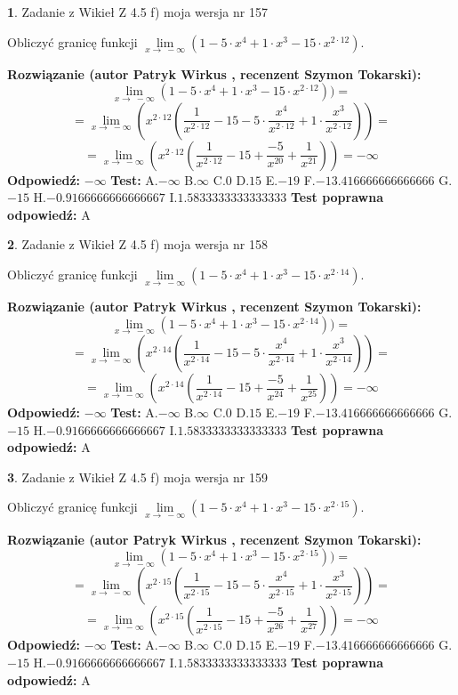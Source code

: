 \documentclass[12pt, a4paper]{article}
\theoremstyle{definition} %
\newtheorem{zad}{}
\newcommand{\zadStart}[1]{\begin{zad}#1\newline}
\newcommand{\zadStop}{\end{zad}}
\newcommand{\rozwStart}[2]{\noindent \textbf{Rozwiązanie (autor #1 , recenzent #2): }\newline}
\newcommand{\rozwStop}{\newline}
\newcommand{\odpStart}{\noindent \textbf{Odpowiedź:}\newline}
\newcommand{\odpStop}{\newline}
\newcommand{\testStart}{\noindent \textbf{Test:}\newline}
\newcommand{\testStop}{\newline}
\newcommand{\kluczStart}{\noindent \textbf{Test poprawna odpowiedź:}\newline}
\newcommand{\kluczStop}{\newline}
\begin{document}
\zadStart{Zadanie z Wikieł Z 4.5 f) moja wersja nr 157}


Obliczyć granicę funkcji  $\lim\limits_{x\to\ -\infty}(1 - 5 \cdot x^{4}+1 \cdot x^{3}- 15 \cdot x^{2\cdot12})$.
\zadStop
\rozwStart{Patryk Wirkus}{Szymon Tokarski}
$$\lim\limits_{x\to\ -\infty}(1 - 5 \cdot x^{4}+1 \cdot x^{3}- 15 \cdot x^{2\cdot12}))=$$
$$=\lim\limits_{x\to\ -\infty}(x^{2\cdot12}(\frac{1}{x^{2\cdot12}}-15 -5 \cdot \frac{x^{4}}{x^{2\cdot12}}+1 \cdot \frac{x^{3}}{x^{2\cdot12}}))=$$
$$=\lim\limits_{x\to\ -\infty}(x^{2\cdot12}(\frac{1}{x^{2\cdot12}}-15 + \frac{-5}{x^{20}}+ \frac{1}{x^{21}}))=-\infty$$
\rozwStop
\odpStart
$-\infty$
\odpStop
\testStart
A.$-\infty$ B.$\infty$ C.$0$ D.$15$ E.$-19$
F.$-13.416666666666666$ G.$-15$
H.$-0.9166666666666667$
I.$1.5833333333333333$
\testStop
\kluczStart
A
\kluczStop



\zadStart{Zadanie z Wikieł Z 4.5 f) moja wersja nr 158}


Obliczyć granicę funkcji  $\lim\limits_{x\to\ -\infty}(1 - 5 \cdot x^{4}+1 \cdot x^{3}- 15 \cdot x^{2\cdot14})$.
\zadStop
\rozwStart{Patryk Wirkus}{Szymon Tokarski}
$$\lim\limits_{x\to\ -\infty}(1 - 5 \cdot x^{4}+1 \cdot x^{3}- 15 \cdot x^{2\cdot14}))=$$
$$=\lim\limits_{x\to\ -\infty}(x^{2\cdot14}(\frac{1}{x^{2\cdot14}}-15 -5 \cdot \frac{x^{4}}{x^{2\cdot14}}+1 \cdot \frac{x^{3}}{x^{2\cdot14}}))=$$
$$=\lim\limits_{x\to\ -\infty}(x^{2\cdot14}(\frac{1}{x^{2\cdot14}}-15 + \frac{-5}{x^{24}}+ \frac{1}{x^{25}}))=-\infty$$
\rozwStop
\odpStart
$-\infty$
\odpStop
\testStart
A.$-\infty$ B.$\infty$ C.$0$ D.$15$ E.$-19$
F.$-13.416666666666666$ G.$-15$
H.$-0.9166666666666667$
I.$1.5833333333333333$
\testStop
\kluczStart
A
\kluczStop



\zadStart{Zadanie z Wikieł Z 4.5 f) moja wersja nr 159}


Obliczyć granicę funkcji  $\lim\limits_{x\to\ -\infty}(1 - 5 \cdot x^{4}+1 \cdot x^{3}- 15 \cdot x^{2\cdot15})$.
\zadStop
\rozwStart{Patryk Wirkus}{Szymon Tokarski}
$$\lim\limits_{x\to\ -\infty}(1 - 5 \cdot x^{4}+1 \cdot x^{3}- 15 \cdot x^{2\cdot15}))=$$
$$=\lim\limits_{x\to\ -\infty}(x^{2\cdot15}(\frac{1}{x^{2\cdot15}}-15 -5 \cdot \frac{x^{4}}{x^{2\cdot15}}+1 \cdot \frac{x^{3}}{x^{2\cdot15}}))=$$
$$=\lim\limits_{x\to\ -\infty}(x^{2\cdot15}(\frac{1}{x^{2\cdot15}}-15 + \frac{-5}{x^{26}}+ \frac{1}{x^{27}}))=-\infty$$
\rozwStop
\odpStart
$-\infty$
\odpStop
\testStart
A.$-\infty$ B.$\infty$ C.$0$ D.$15$ E.$-19$
F.$-13.416666666666666$ G.$-15$
H.$-0.9166666666666667$
I.$1.5833333333333333$
\testStop
\kluczStart
A
\kluczStop
\end{document}
